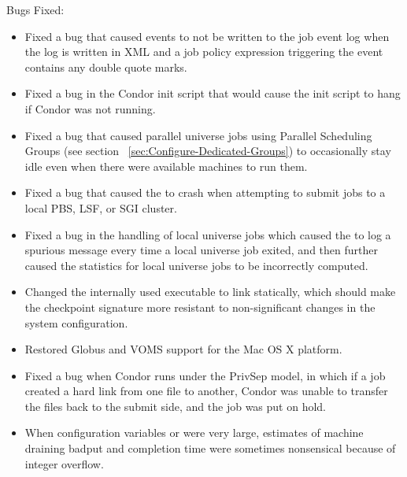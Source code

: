 \noindent Bugs Fixed:

\begin{itemize}

\item Fixed a bug that caused events to not be written to the job event
log when the log is written in XML and a job policy expression triggering
the event contains any double quote marks.

\item Fixed a bug in the Condor init script that would cause
the init script to hang if Condor was not running.

\item Fixed a bug that caused parallel universe jobs using
Parallel Scheduling Groups 
(see section ~\ref{sec:Configure-Dedicated-Groups})
to occasionally stay idle even when
there were available machines to run them.

\item Fixed a bug that caused the  to crash when
attempting to submit jobs to a local PBS, LSF, or SGI cluster.

\item Fixed a bug in the handling of local universe jobs which caused
the  to log a spurious  message
every time a local universe job exited, 
and then further caused the statistics for local universe jobs to be 
incorrectly computed.

\item Changed the internally used  executable
to link statically, which should make the
checkpoint signature more resistant to non-significant changes in the system
configuration.

\item Restored Globus and VOMS support for the Mac OS X platform.

\item Fixed a bug when Condor runs under the PrivSep model,
in which if a job created a hard link from one file to another,
Condor was unable to transfer the files back to the submit side,
and the job was put on hold.

\item When configuration variables  or
 were very large, estimates of machine
draining badput and completion time were sometimes nonsensical
because of integer overflow.


\end{itemize}

